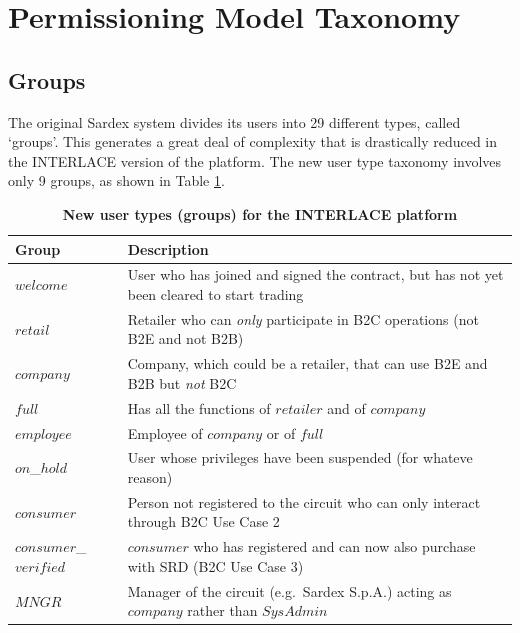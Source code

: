 \section{Permissioning Model Taxonomy}
\subsection{Groups}
The original Sardex system divides its users into 29 different types, called `groups'. This generates a great deal of complexity that is drastically reduced in the INTERLACE version of the platform. The new user type taxonomy involves only 9 groups, as shown in Table \ref{tab:groups}.

\setlength{\tabcolsep}{10pt}
\begin{table}[h]
\begin{centering}
\small
{
\begin{tabular}{| l | l | }
\hline
\textbf{Group}	& \textbf{Description} \\
\hline
$welcome$ & User who has joined and signed the contract, but has not yet been cleared to start trading \\
\hline
$retail$ & Retailer who can \emph{only} participate in B2C operations (not B2E and not B2B) \\
\hline
$company$ & Company, which could be a retailer, that can use B2E and B2B but \emph{not} B2C \\
\hline
$full$ & Has all the functions of $retailer$ and of $company$ \\
\hline
$employee$ & Employee of $company$ or of $full$ \\
\hline
$on$\_$hold$ & User whose privileges have been suspended (for whateve reason) \\
\hline
$consumer$ & Person not registered to the circuit who can only interact through B2C Use Case 2 \\
\hline
$consumer$\_$verified$ & $consumer$ who has registered and can now also purchase with SRD (B2C Use Case 3)  \\
\hline
$MNGR$ & Manager of the circuit (e.g.\ Sardex S.p.A.) acting as $company$ rather than $SysAdmin$ \\
\hline
\end{tabular}
}
\caption{\small\textbf{New user types (groups) for the INTERLACE platform}}
\label{tab:groups}
\end{centering}
\end{table}
\vspace{-0.5cm}


